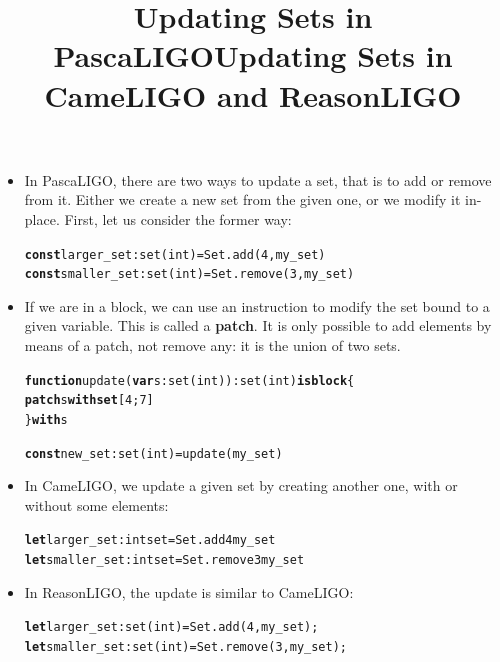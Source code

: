 \documentclass[wide]{slides}
\newcommand{\Kblock}[0]{\textbf{block}\xspace}
\newcommand{\Kconst}[0]{\textbf{const}\xspace}
\newcommand{\Kfunction}[0]{\textbf{function}\xspace}
\newcommand{\Kis}[0]{\textbf{is}\xspace}
\newcommand{\Kpatch}[0]{\textbf{patch}\xspace}
\newcommand{\Kset}[0]{\textbf{set}\xspace}
\newcommand{\Kvar}[0]{\textbf{var}\xspace}
\newcommand{\Kwith}[0]{\textbf{with}\xspace}
\newcommand{\Klet}[0]{\textbf{let}\xspace}
\begin{document}
\begin{slide}
  \title{Updating Sets in PascaLIGO}

  \begin{itemize}

    \item In PascaLIGO, there are two ways to update a set, that is to
      add or remove from it. Either we create a new set from the given
      one, or we modify it in-place. First, let us consider the former
      way:
      \begin{alltt}
\Kconst larger_set  : set (int) = Set.add (4, my_set)
\Kconst smaller_set : set (int) = Set.remove (3, my_set)
      \end{alltt}

    \item If we are in a block, we can use an instruction to modify
      the set bound to a given variable. This is called a
      \textbf{patch}. It is only possible to add elements by means of
      a patch, not remove any: it is the union of two sets.
      \begin{alltt}
\Kfunction update (\Kvar s : set (int)) : set (int) \Kis \Kblock \{
  \Kpatch s \Kwith \Kset [4; 7]
\} \Kwith s

\Kconst new_set : set (int) = update (my_set)
      \end{alltt}

  \end{itemize}

\end{slide}

\begin{slide}
  \title{Updating Sets in CameLIGO and ReasonLIGO}

  \begin{itemize}

    \item In CameLIGO, we update a given set by creating another one,
      with or without some elements:
      \begin{alltt}
\Klet larger_set  : int set = Set.add 4 my_set
\Klet smaller_set : int set = Set.remove 3 my_set
      \end{alltt}

    \item In ReasonLIGO, the update is similar to CameLIGO:
      \begin{alltt}
\Klet larger_set  : set (int) = Set.add (4, my_set);
\Klet smaller_set : set (int) = Set.remove (3, my_set);
      \end{alltt}

  \end{itemize}

\end{slide}
\end{document}
